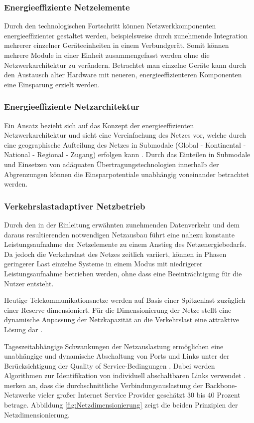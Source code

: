 \subsubsection{Energieeffiziente Netzelemente}
Durch den technologischen Fortschritt können Netzwerkkomponenten energieeffizienter gestaltet werden, beispielsweise durch zunehmende Integration mehrerer einzelner Geräte\-einheiten in einem Verbundgerät. Somit können mehrere Module in einer Einheit zusammengefasst werden ohne die Netzwerkarchitektur zu verändern. Betrachtet man einzelne Geräte kann durch den Austausch alter Hardware mit neueren, energieeffizienteren Komponenten eine Einsparung erzielt werden. 

\subsubsection{Energieeffiziente Netzarchitektur}
Ein Ansatz bezieht sich auf das Konzept der energieeffizienten Netzwerkarchitektur und sieht eine Vereinfachung des Netzes vor, welche durch eine geographische Aufteilung des Netzes in Submodale (Global - Kontinental - National - Regional - Zugang) erfolgen kann \cite{aleksic2014}. Durch das Einteilen in Submodale und Einsetzen von adäquaten Übertragungs\-technologien innerhalb der Abgrenzungen können die Einsparpotentiale unabhängig voneinander betrachtet werden.

\subsubsection{Verkehrslastadaptiver Netzbetrieb}
Durch den in der Einleitung erwähnten zunehmenden Datenverkehr und dem daraus resultierenden notwendigen Netzausbau führt eine nahezu konstante Leistungsaufnahme der Netzelemente zu einem Anstieg des Netzenergiebedarfs. Da jedoch die Verkehrslast des Netzes zeitlich variiert, können in Phasen geringerer Last einzelne Systeme in einem Modus mit niedrigerer Leistungsaufnahme betrieben werden, ohne dass eine Beeinträchtigung für die Nutzer entsteht.

Heutige Telekommunikationsnetze werden auf Basis einer Spitzenlast zuzüglich einer Reserve dimensioniert. Für die Dimensionierung der Netze stellt eine dynamische Anpassung der Netzkapazität an die Verkehrslast eine attraktive Lösung dar \cite{lange}.

Tageszeitabhängige Schwankungen der Netzauslastung ermöglichen eine unabhängige und dynamische Abschaltung von Ports und Links unter der Be\-rück\-sich\-ti\-gung der Quality of Service-Bedingungen \cite{aleksic2013}. Dabei werden Algorithmen zur Identifikation von individuell abschaltbaren Links verwendet \cite{fassnacht}. \textcite[1]{fisher} merken an, dass die durchschnittliche Verbindungsauslastung der Backbone-Netzwerke vieler großer Internet Service Provider geschätzt 30 bis 40 Prozent betrage. Abbildung \ref{fig:Netzdimensionierung} zeigt die beiden Prinzipien der Netzdimensionierung.

